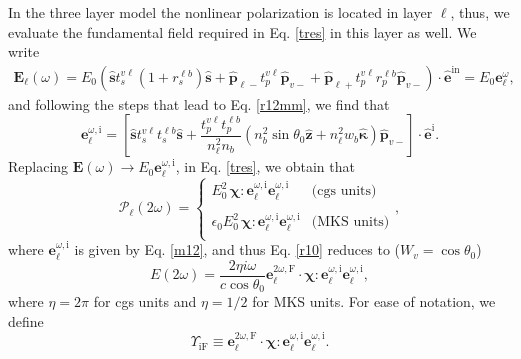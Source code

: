 In the three layer model the nonlinear polarization is located in layer
$\ell$, thus, we evaluate the fundamental field required in Eq. \eqref{tres}
in this layer as well. We write
\begin{equation}\label{m2}
\begin{split}
\mathbf{E}_{\ell}(\omega)=E_0\left(
\hat{\mathbf{s}} t^{v\ell}_s(1+r^{\ell b}_s)\hat{\mathbf{s}}
+
\hat{\mathbf{p}}_{\ell-}
 t^{v\ell}_{p}
\hat{\mathbf{p}}_{v-}
+
\hat{\mathbf{p}}_{\ell+}
t^{v\ell}_{p}r^{\ell b}_{p}
\hat{\mathbf{p}}_{v-}
\right)\cdot\hat{\mathbf{e}}^{\mathrm{in}}=E_0\mathbf{e}^\omega_{\ell}
,
\end{split}
\end{equation} 
and following the steps that lead to Eq. \eqref{r12mm}, we find that
\begin{equation}\label{m12}
\mathbf{e}^{\omega,\mathrm{i}}_{\ell}
= \left[
\hat{\mathbf{s}}t_{s}^{v\ell}t_{s}^{\ell b}\hat{\mathbf{s}} 
+ \frac{t^{v\ell}_{p}t^{\ell b}_{p}}
       {n^{2}_{\ell}n_{b}}
\left(
  n^{2}_{b}\sin\theta_{0}\hat{\mathbf{z}}
+ n^{2}_{\ell}w_{b}\hat{\boldsymbol{\kappa}}
\right)
\hat{\mathbf{p}}_{v-}
\right]
\cdot\hat{\mathbf{e}}^{\mathrm{i}}.
\end{equation}  
Replacing $\mathbf{E}(\omega)\to E_0\mathbf{e}^{\omega,\mathrm{i}}_\ell$,  
in Eq. \eqref{tres}, we obtain that
\begin{equation}\label{m4}
\boldsymbol{\mathcal{P}}_\ell(2\omega) = 
\left\{
\begin{array}{cc}  
E^{2}_{0}\,\boldsymbol{\chi}:
\mathbf{e}^{\omega,\mathrm{i}}_{\ell}\mathbf{e}^{\omega,\mathrm{i}}_{\ell}
& \text{(cgs units)} \\\\
\epsilon_{0}E^{2}_{0}\,\boldsymbol{\chi}:
\mathbf{e}^{\omega,\mathrm{i}}_{\ell}\mathbf{e}^{\omega,\mathrm{i}}_{\ell}
& \text{(MKS units)} \\
\end{array}
\right.,
\end{equation}
where $\mathbf{e}^{\omega,\mathrm{i}}_{\ell}$ is given by Eq. \eqref{m12},
and thus
Eq. \eqref{r10} reduces to ($W_{v}=\cos\theta_{0}$)
\begin{equation}\label{mr10}
E(2\omega) =
\frac{2\eta i \omega}{c\cos\theta_{0}}
\mathbf{e}^{2\omega,\mathrm{F}}_{\ell}\cdot\boldsymbol{\chi}:
\mathbf{e}^{\omega,\mathrm{i}}_{\ell}\mathbf{e}^{\omega,\mathrm{i}}_{\ell}
,
\end{equation}
where $\eta=2\pi$ for cgs units and $\eta=1/2$ for MKS units. For ease of
notation, we define
\begin{equation}\label{mc0}
\Upsilon_{\mathrm{iF}}
\equiv 
\mathbf{e}^{2\omega,\mathrm{F}}_{\ell}\cdot\boldsymbol{\chi}:
\mathbf{e}^{\omega,\mathrm{i}}_{\ell}\mathbf{e}^{\omega,\mathrm{i}}_{\ell}
.
\end{equation}
